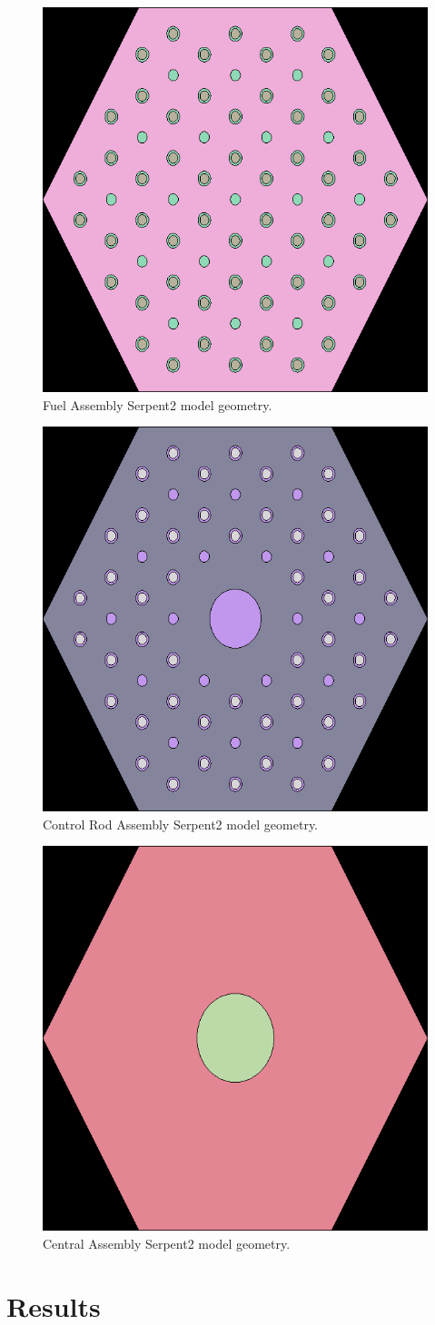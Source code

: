 \documentclass[11pt,letterpaper]{article}
\begin{document}
\begin{figure}[H]
	\centering
	\includegraphics[width=0.4\linewidth]{figures/fuel_block_geom1.png} 
	\hfill
	\caption{Fuel Assembly Serpent2 model geometry.}
	\label{fig:FuelAssembly}
\end{figure}

\begin{figure}[H]
	\centering
	\includegraphics[width=0.4\linewidth]{figures/control_block_geom1.png} 
	\hfill
	\caption{Control Rod Assembly Serpent2 model geometry.}
	\label{fig:ControlRodAssembly}
\end{figure}

\begin{figure}[H]
	\centering
	\includegraphics[width=0.4\linewidth]{figures/central_block_geom1.png}
	\hfill
	\caption{Central Assembly Serpent2 model geometry.}
	\label{fig:CentralAssembly}
\end{figure}

\section{Results}
\end{document}
